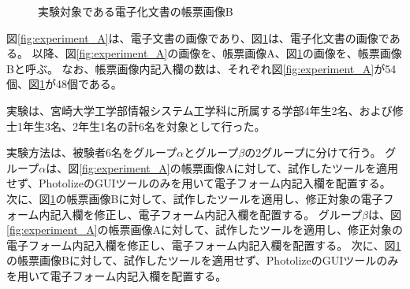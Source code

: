 \begin{figure}[tp]
    \begin{center}
        \caption{実験対象である電子化文書の帳票画像B}
        \label{fig:experiment_B}
    \end{center}
\end{figure}
図\ref{fig:experiment_A}は、電子文書の画像であり、図\ref{fig:experiment_B}は、電子化文書の画像である。
以降、図\ref{fig:experiment_A}の画像を、帳票画像A、図\ref{fig:experiment_B}の画像を、帳票画像Bと呼ぶ。
なお、帳票画像内記入欄の数は、それぞれ図\ref{fig:experiment_A}が54個、図\ref{fig:experiment_B}が48個である。

実験は、宮崎大学工学部情報システム工学科に所属する学部4年生2名、および修士1年生3名、2年生1名の計6名を対象として行った。

実験方法は、被験者6名をグループ$\alpha$とグループ$\beta$の2グループに分けて行う。
グループ$\alpha$は、図\ref{fig:experiment_A}の帳票画像Aに対して、試作したツールを適用せず、PhotolizeのGUIツールのみを用いて電子フォーム内記入欄を配置する。
次に、図\ref{fig:experiment_B}の帳票画像Bに対して、試作したツールを適用し、修正対象の電子フォーム内記入欄を修正し、電子フォーム内記入欄を配置する。
グループ$\beta$は、図\ref{fig:experiment_A}の帳票画像Aに対して、試作したツールを適用し、修正対象の電子フォーム内記入欄を修正し、電子フォーム内記入欄を配置する。
次に、図\ref{fig:experiment_B}の帳票画像Bに対して、試作したツールを適用せず、PhotolizeのGUIツールのみを用いて電子フォーム内記入欄を配置する。

